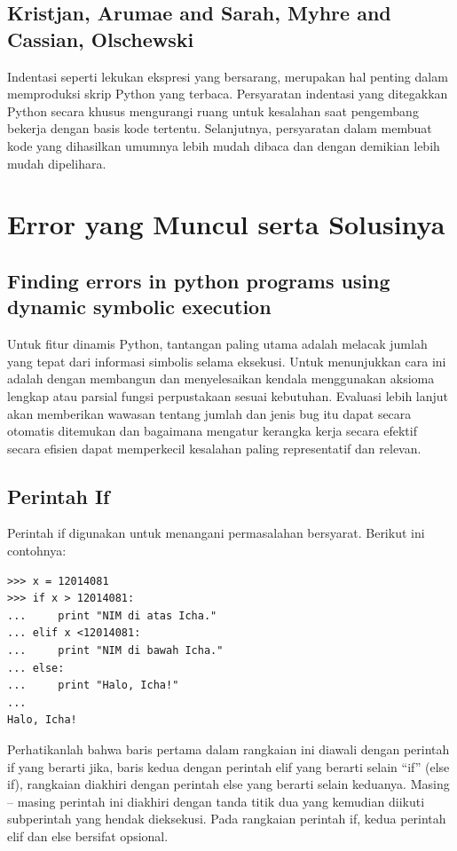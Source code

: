\documentclass[12pt]{article}
\begin{document}
\subsection{Kristjan, Arumae and Sarah, Myhre and Cassian, Olschewski}
Indentasi seperti lekukan ekspresi yang bersarang, merupakan hal penting dalam memproduksi skrip Python yang terbaca. Persyaratan indentasi yang ditegakkan Python secara khusus mengurangi ruang untuk kesalahan saat pengembang bekerja dengan basis kode tertentu. Selanjutnya, persyaratan dalam membuat kode yang dihasilkan umumnya lebih mudah dibaca dan dengan demikian lebih mudah dipelihara\cite{kristjansoccer}.


\section{Error yang Muncul serta Solusinya}

\subsection{Finding errors in python programs using dynamic symbolic execution}
Untuk fitur dinamis Python, tantangan paling utama adalah melacak jumlah yang tepat dari informasi simbolis selama eksekusi. Untuk menunjukkan cara ini adalah dengan membangun dan menyelesaikan kendala menggunakan aksioma lengkap atau parsial fungsi perpustakaan sesuai kebutuhan. Evaluasi lebih lanjut akan memberikan wawasan tentang jumlah dan jenis bug itu dapat secara otomatis ditemukan dan bagaimana mengatur kerangka kerja secara efektif secara efisien dapat memperkecil kesalahan paling representatif dan relevan\cite{sapra2013finding}.

\subsection{Perintah If}
Perintah if digunakan untuk menangani permasalahan bersyarat. Berikut ini contohnya:
\begin{verbatim}
>>> x = 12014081
>>> if x > 12014081:
... 	print "NIM di atas Icha."
... elif x <12014081:
... 	print "NIM di bawah Icha."
... else:
... 	print "Halo, Icha!"
...
Halo, Icha!
\end{verbatim}

Perhatikanlah bahwa baris pertama dalam rangkaian ini diawali dengan perintah if yang berarti jika, baris kedua dengan perintah elif yang berarti selain “if” (else if), rangkaian diakhiri dengan perintah else yang berarti selain keduanya. Masing – masing perintah ini diakhiri dengan tanda titik dua yang kemudian diikuti subperintah yang hendak dieksekusi. Pada rangkaian perintah if, kedua perintah elif dan else bersifat opsional.
\end{document}
